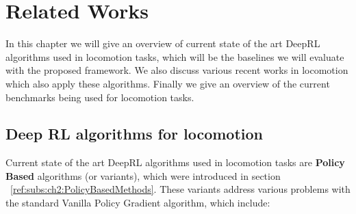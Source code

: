 

\chapter{Related Works}
\label{ch:relatedWorks}





In this chapter we will give an overview of current state of the art DeepRL algorithms
used in locomotion tasks, which will be the baselines we will evaluate with the proposed
framework. We also discuss various recent works in locomotion which also apply 
these algorithms. Finally we give an overview of the current benchmarks being
used for locomotion tasks.

\section{Deep RL algorithms for locomotion} \label{sec:ch3_deeprl_algorithms}

Current state of the art DeepRL algorithms used in locomotion tasks are \textbf{Policy Based} 
algorithms (or variants), which were introduced in section ~\ref{ref:subs:ch2:PolicyBasedMethods}. 
These variants address various problems with the standard Vanilla Policy Gradient algorithm,
which include:

